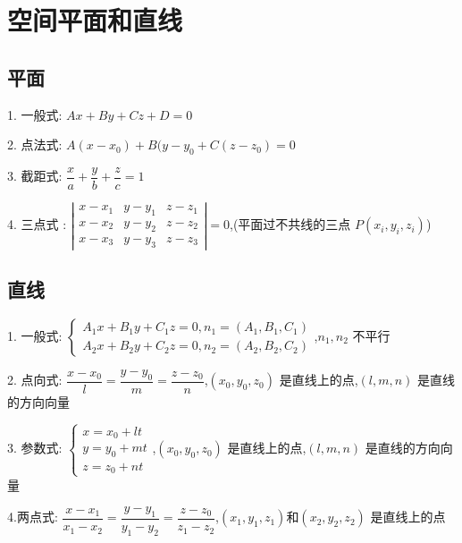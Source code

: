 \section{空间平面和直线}
\subsection{平面}
\begin{definition}[	平面方程]
	
	1. 一般式:  $Ax+By+Cz+D=0$
	
	2. 点法式:  $A(x-x_{0})+B(y-y_{0}+C(z-z_{0})=0$
	
	3. 截距式:  $\dfrac{x}{a}+\dfrac{y}{b}+\dfrac{z}{c}=1$
	
	4. 三点式 : $\left|\begin{array}{lll}
		x-x_{1}&y-y_{1}&z-z_{1}\\
		x-x_{2}&y-y_{2}&z-z_{2}\\
		x-x_{3}&y-y_{3}&z-z_{3}
	\end{array}\right|=0$,(平面过不共线的三点 $P(x_{i},y_{i},z_{i})$)
\end{definition}
\subsection{直线}
\begin{definition}[直线方程]
	
	1. 一般式:  $\left\lbrace \begin{array}{c}
		A_{1}x+B_{1}y+C_{1}z=0,n_{1}=(A_{1},B_{1},C_{1})\\A_{2}x+B_{2}y+C_{2}z=0,n_{2}=(A_{2},B_{2},C_{2})
	\end{array}\right. $,$n_{1},n_{2}$ 不平行
	
	2. 点向式:  $\dfrac{x-x_{0}}{l}=\dfrac{y-y_{0}}{m}=\dfrac{z-z_{0}}{n}$,$(x_{0},y_{0},z_{0})$ 是直线上的点,$(l,m,n)$ 是直线的方向向量
	
	3. 参数式:  $\left\lbrace\begin{array}{l}
		x=x_{0}+lt\\
		y=y_{0}+mt\\
		z=z_{0}+nt
	\end{array} \right. $,$(x_{0},y_{0},z_{0})$ 是直线上的点,$(l,m,n)$ 是直线的方向向量
	
	4.两点式: $\dfrac{x-x_{1}}{x_{1}-x_{2}}=\dfrac{y-y_{1}}{y_{1}-y_{2}}=\dfrac{z-z_{0}}{z_{1}-z_{2}}$,$(x_{1},y_{1},z_{1})$和$(x_{2},y_{2},z_{2})$ 是直线上的点
\end{definition}
